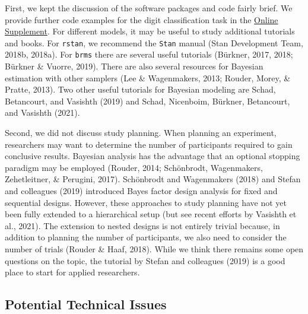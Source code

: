 \documentclass[
  english,
  doc,floatsintext]{apa6}
\begin{document}
First, we kept the discussion of the software packages and code fairly brief. We provide further code examples for the digit classification task in the \href{https://github.com/MyrtheV/Bayesian-Hierarchical-Modelling-An-Introduction-and-Reassessment}{Online Supplement}. For different models, it may be useful to study additional tutorials and books. For \texttt{rstan}, we recommend the \texttt{Stan} manual (Stan Development Team, 2018b, 2018a). For \texttt{brms} there are several useful tutorials (Bürkner, 2017, 2018; Bürkner \& Vuorre, 2019). There are also several resources for Bayesian estimation with other samplers (Lee \& Wagenmakers, 2013; Rouder, Morey, \& Pratte, 2013). Two other useful tutorials for Bayesian modeling are Schad, Betancourt, and
Vasishth (2019) and Schad, Nicenboim, Bürkner, Betancourt, and Vasishth (2021).

Second, we did not discuss study planning. When planning an experiment, researchers may want to determine the number of participants required to gain conclusive results. Bayesian analysis has the advantage that an optional stopping paradigm may be employed (Rouder, 2014; Schönbrodt, Wagenmakers, Zehetleitner, \& Perugini, 2017). Schönbrodt and Wagenmakers (2018) and Stefan and colleagues (2019) introduced Bayes factor design analysis for fixed and sequential designs. However, these approaches to study planning have not yet been fully extended to a hierarchical setup (but see recent efforts by Vasishth et al., 2021). The extension to nested designs is not entirely trivial because, in addition to planning the number of participants, we also need to consider the number of trials (Rouder \& Haaf, 2018). While we think there remains some open questions on the topic, the tutorial by Stefan and colleagues (2019) is a good place to start for applied researchers.

\hypertarget{potential-technical-issues}{%
\subsection{Potential Technical Issues}\label{potential-technical-issues}}
\end{document}
